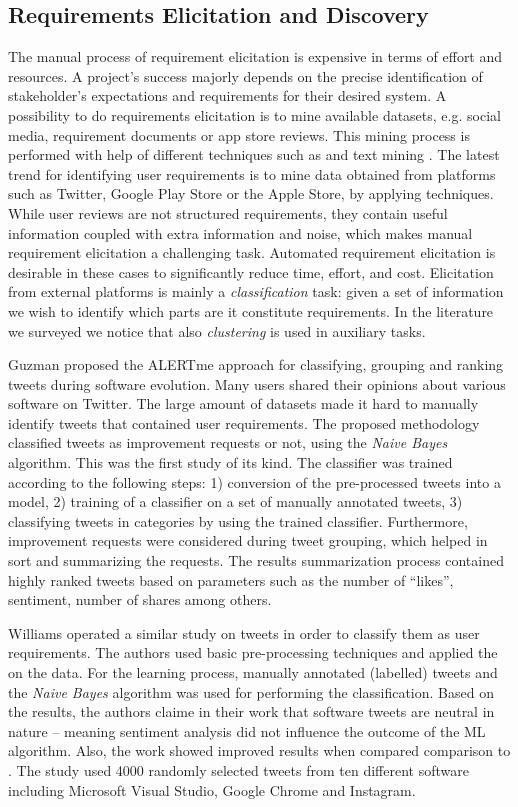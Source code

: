 \subsection{Requirements Elicitation and Discovery}

The manual process of requirement elicitation is expensive in terms of effort
and resources. A project's success majorly depends on the precise identification
of stakeholder's expectations and requirements for their desired system. A
possibility to do requirements elicitation is to mine available datasets, e.g.
social media, requirement documents or  app store reviews. This mining process
is performed with help of different techniques such as \NLP and text mining
\cite{Hollis2017}\cite{dong2010}. The latest trend for identifying
user requirements is to mine data obtained from platforms such as Twitter,
Google Play Store or the Apple Store, by applying \ML techniques. While user
reviews are not structured requirements, they contain useful information
coupled with extra information and noise, which makes manual requirement
elicitation a challenging task. Automated requirement elicitation is desirable
in these cases to significantly reduce time, effort, and cost. Elicitation from
external platforms is mainly a \ML \emph{classification} task: given a set of
information we wish to identify which parts are it constitute requirements. In
the literature we surveyed we notice that also \emph{clustering} is used in
auxiliary tasks.

Guzman \etal \cite{Guzman:2017} proposed the ALERTme approach for classifying,
grouping and ranking tweets during software evolution. Many users shared their
opinions about various software on Twitter. The large amount of datasets made it
hard to manually identify tweets that contained user requirements. The proposed
methodology classified tweets as improvement requests or not, using the
\emph{Naive Bayes} algorithm. This was the first study of its kind.
The classifier was trained according to the following steps: 1) conversion of
the pre-processed tweets into a \VSM model, 2) training of a classifier on a set
of manually annotated tweets, 3) classifying tweets in categories by using the
trained classifier. Furthermore, improvement requests were considered during
tweet grouping, which helped in sort and summarizing the requests. The
results summarization process contained highly ranked tweets based on
parameters such as the number of ``likes'', sentiment, number of shares among
others.

Williams \etal \cite{Williams:2017} operated a similar study on tweets in order
to classify them as user requirements. The authors used basic pre-processing
techniques and applied the \VSM on the data. For the learning process, manually
annotated (labelled) tweets and the \emph{Naive Bayes} algorithm was used for
performing the classification. Based on the results, the authors claime in their
work that software tweets are neutral in nature -- meaning sentiment analysis
did not influence the outcome of the ML algorithm. Also, the work showed
improved results when compared comparison to \cite{Guzman:2017}.
The study used 4000 randomly selected tweets from ten different software
including Microsoft Visual Studio, Google Chrome and Instagram.

